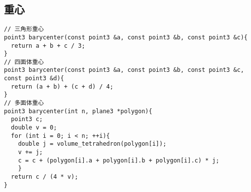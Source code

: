 \subsection{重心}
\begin{lstlisting}[language={}]
// 三角形重心
point3 barycenter(const point3 &a, const point3 &b, const point3 &c){
  return a + b + c / 3;
}
// 四面体重心 
point3 barycenter(const point3 &a, const point3 &b, const point3 &c, const point3 &d){
  return (a + b) + (c + d) / 4;
}
// 多面体重心
point3 barycenter(int n, plane3 *polygon){
  point3 c;
  double v = 0;
  for (int i = 0; i < n; ++i){
    double j = volume_tetrahedron(polygon[i]);
    v += j;
    c = c + (polygon[i].a + polygon[i].b + polygon[i].c) * j;
    }
  return c / (4 * v);
}
\end{lstlisting}
